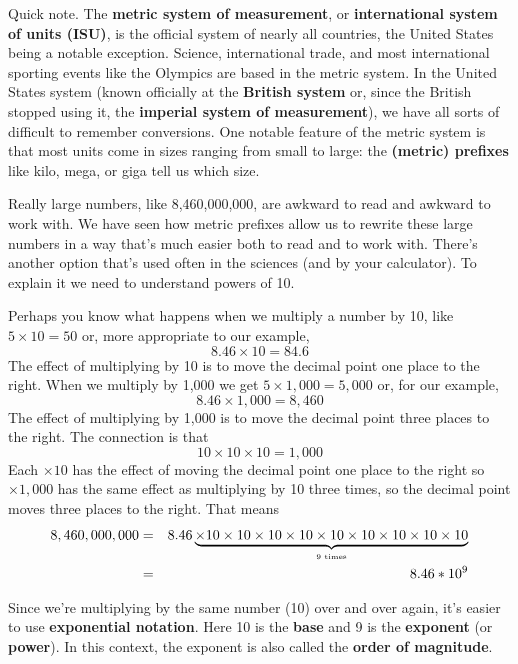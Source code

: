 Quick note.  The \textbf{metric system of measurement}, or \textbf{international system of units (ISU)}, is the official system of nearly all countries, the United States being a notable exception.  Science, international trade, and most international sporting events like the Olympics are based in the metric system.  
In the United States system (known officially at the \textbf{British system} or, since the British stopped using it, the \textbf{imperial system of measurement}), we have all sorts of difficult to remember conversions. 
One notable feature of the metric system is that most units come in sizes ranging from small to large:  the \textbf{(metric) prefixes} like kilo, mega, or giga tell us which size.

Really large numbers, like 8,460,000,000, are awkward to read and awkward to work with.  We have seen how metric prefixes  allow us to rewrite these large numbers in a way that's much easier both to read and to work with.  There's another option that's used often in the sciences (and by your calculator).  To explain it we need to understand powers of 10.

 Perhaps you know what happens when we multiply a number by 10, like
$ 5 \times 10 = 50$ or, more appropriate to our example, $$ 8.46 \times 10 = 84.6$$
The effect of multiplying by 10 is to move the decimal point one place to the right.
When we multiply by 1,000 we get
$ 5 \times 1,000 = 5,000 $ or, for our example, $$8.46 \times 1,000 = 8,460$$
The effect of multiplying by 1,000 is to move the decimal point three places to the right.
The connection is that $$10 \times 10 \times 10  =1,000$$
Each $\times 10$ has the effect of moving the decimal point one place to the right so $\times 1,000$ has the same effect as multiplying by 10 three times, so the decimal point moves three places to the right.
That means 
\begin{eqnarray*}
8,460,000,000 & = & 8.46 \underbrace{\hbox{$\times 10 \times 10  \times 10  \times 10  \times 10  \times 10  \times 10  \times 10  \times 10 $}}_{\hbox{\begin{tiny} 9 times \end{tiny}}}  \\  %
& = & 8.46 \ast 10^ 9 \\  
\end{eqnarray*} 
\vspace{-.5in} %

\noindent Since we're multiplying by the same number (10) over and over again, it's easier to use \textbf{exponential notation}. Here 10 is the \textbf{base} and 9 is the \textbf{exponent} (or \textbf{power}).  In this context, the exponent is also called the \textbf{order of magnitude}. %

